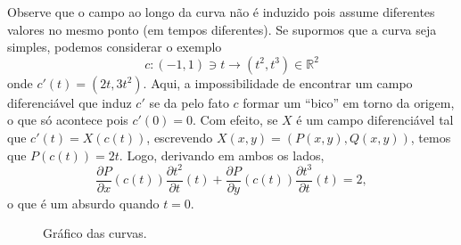 Observe que o campo ao longo da curva não é induzido pois assume diferentes valores no mesmo ponto (em tempos diferentes). Se supormos que a curva seja simples, podemos considerar o exemplo
\begin{equation*}
	c:(-1, 1) \ni t \to (t^{2},t^{3}) \in \mathbb{R}^{2}
\end{equation*}
onde $c'(t)=(2t, 3t^{2})$.
Aqui, a impossibilidade de encontrar um campo diferenciável que induz $c'$ se da pelo fato $c$ formar um ``bico'' em torno da origem, o que só acontece pois $c'(0)=0$. Com efeito, se $X$ é um campo diferenciável tal que $c'(t)=X(c(t))$, escrevendo $X(x,y)=(P(x,y),Q(x,y))$, temos que $P(c(t))=2t$. Logo, derivando em ambos os lados,
\begin{equation*}
	\frac{\partial P}{\partial x}(c(t))\frac{\partial t^{2}}{\partial t}(t) + \frac{\partial P}{\partial y}(c(t))\frac{\partial t^{3}}{\partial t}(t)=2,
\end{equation*}
o que é um absurdo quando $t=0$.

\begin{figure}
	\centering
	
	\caption{Gráfico das curvas.}
\end{figure}

